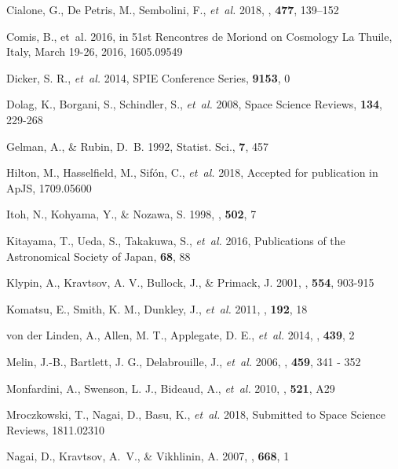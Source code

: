 \documentclass[twocolumn,traditabstract]{aa}
\begin{document}
\begin{thebibliography}{81}
{Cialone}, G., De Petris, M., Sembolini, F., \emph{et~al.} 2018, \mnras, \textbf{477}, 139–152

Comis, B., {et~al.} 2016, in {51st Rencontres de Moriond on Cosmology La
  Thuile, Italy, March 19-26, 2016}, 1605.09549

Dicker, S. R., \emph{et~al.} 2014, SPIE Conference Series, \textbf{9153}, 0

{Dolag}, K., Borgani, S., Schindler, S., \emph{et~al.} 2008, Space Science Reviews, \textbf{134}, 229-268

Gelman, A., \& Rubin, D.~B. 1992, Statist. Sci., \textbf{7}, 457

Hilton, M., Hasselfield, M., Sif\'on, C., \emph{et~al.} 2018, Accepted for publication in ApJS, 1709.05600

Itoh, N., Kohyama, Y., \& Nozawa, S. 1998, \apj, \textbf{502}, 7

Kitayama, T., Ueda, S., Takakuwa, S., \emph{et~al.} 2016, Publications of the Astronomical Society of Japan, \textbf{68}, 88

{Klypin}, A., Kravtsov, A. V., Bullock, J., \& Primack, J. 2001, \apj, \textbf{554}, 903-915

{Komatsu}, E., Smith, K. M., Dunkley, J., \emph{et~al.} 2011, \apjs, \textbf{192}, 18

{von der Linden}, A., Allen, M. T., Applegate, D. E., \emph{et~al.} 2014, \mnras, \textbf{439}, 2

{Melin}, J.-B., {Bartlett}, J. G., Delabrouille, J., \emph{et~al.} 2006, \aap, \textbf{459}, 341 - 352

Monfardini, A., Swenson, L. J., Bideaud, A., \emph{et~al.} 2010, \aap, \textbf{521}, A29

Mroczkowski, T., Nagai, D., Basu, K., \emph{et~al.} 2018, Submitted to Space Science Reviews, 1811.02310

{Nagai}, D., {Kravtsov}, A.~V., \& {Vikhlinin}, A. 2007, \apj, \textbf{668}, 1


\end{thebibliography}
\end{document}
